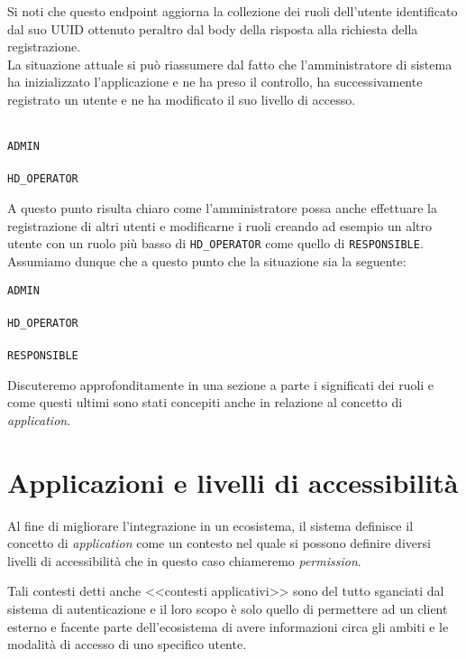 \documentclass[a4paper,12pt]{article}
\begin{document}
Si noti che questo endpoint aggiorna la collezione dei ruoli dell’utente identificato dal suo UUID ottenuto peraltro dal body della risposta alla richiesta della registrazione. \\

La situazione attuale si può riassumere dal fatto che l’amministratore di sistema ha inizializzato l’applicazione e ne ha preso il controllo, ha successivamente registrato un utente e ne ha modificato il suo livello di accesso.\\
\\
\begin{center}
	\texttt{ADMIN} \\
	\downarrow \\
	\texttt{HD\_OPERATOR}
\end{center}

A questo punto risulta chiaro come l’amministratore possa anche effettuare la registrazione di altri utenti e modificarne i ruoli creando ad esempio un altro utente con un ruolo più basso di \texttt{HD\_OPERATOR} come quello di \texttt{RESPONSIBLE}. \\

Assumiamo dunque che a questo punto che la situazione sia la seguente:
\begin{center}
	\texttt{ADMIN} \\
	\downarrow \\
	\texttt{HD\_OPERATOR} \\
	\downarrow \\
	\texttt{RESPONSIBLE}
\end{center}

Discuteremo approfonditamente in una sezione a parte i significati dei ruoli e come questi ultimi sono stati concepiti anche in relazione al concetto di \textit{application}.

\section{Applicazioni e livelli di accessibilità}
Al fine di migliorare l'integrazione in un ecosistema, il sistema definisce il concetto di \textit{application} come un contesto nel quale si possono definire diversi livelli di accessibilità che in questo caso chiameremo \textit{permission}.

Tali contesti detti anche <<contesti applicativi>> sono del tutto sganciati dal sistema di autenticazione e il loro scopo è solo quello di permettere ad un client esterno e facente parte dell'ecosistema di avere informazioni circa gli ambiti e le modalità di accesso di uno specifico utente.\\
\end{document}
